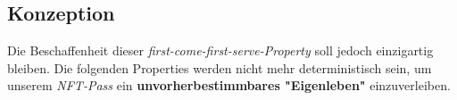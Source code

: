 
\subsection{Konzeption}

\vspace{0.3cm}





Die Beschaffenheit dieser \textit{first-come-first-serve-Property} soll jedoch einzigartig bleiben. Die folgenden Properties werden nicht mehr deterministisch sein, um unserem \textit{NFT-Pass} ein \textbf{unvorherbestimmbares "Eigenleben"} einzuverleiben. 


%



%

% 



\vspace{0.5cm}





